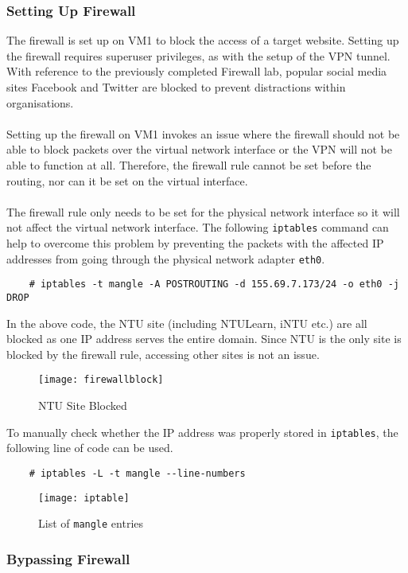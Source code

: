 \documentclass[a4paper,12pt]{article}
\begin{document}
	\subsubsection{Setting Up Firewall}
	The firewall is set up on VM1 to block the access of a target website. Setting up the firewall requires superuser privileges, as with the setup of the VPN tunnel. With reference to the previously completed Firewall lab, popular social media sites Facebook and Twitter are blocked to prevent distractions within organisations.
\\\\
	Setting up the firewall on VM1 invokes an issue where the firewall should not be able to block packets over the virtual network interface or the VPN will not be able to function at all. Therefore, the firewall rule cannot be set before the routing, nor can it be set on the virtual interface.\\\\
	The firewall rule only needs to be set for the physical network interface so it will not affect the virtual network interface. The following \texttt{iptables} command can help to overcome this problem by preventing the packets with the affected IP addresses from going through the physical network adapter \texttt{eth0}.
	\begin{verbatim}
	# iptables -t mangle -A POSTROUTING -d 155.69.7.173/24 -o eth0 -j DROP
	\end{verbatim}
	In the above code, the NTU site (including NTULearn, iNTU etc.) are all blocked as one IP address serves the entire domain. Since NTU is the only site is blocked by the firewall rule, accessing other sites is not an issue. 
	\begin{figure}[H]
	\centering
	\texttt{[image: firewallblock]}
	\caption{NTU Site Blocked}
	\label{fig:firewallblock}
	\end{figure}
	\noindent To manually check whether the IP address was properly stored in \texttt{iptables}, the following line of code can be used.
	\begin{verbatim}
	# iptables -L -t mangle --line-numbers
	\end{verbatim}
\begin{figure}[H]
\centering
\texttt{[image: iptable]}
\caption{List of \texttt{mangle} entries}
\label{fig:iptable}
\end{figure}
	\subsubsection{Bypassing Firewall}
\end{document}
